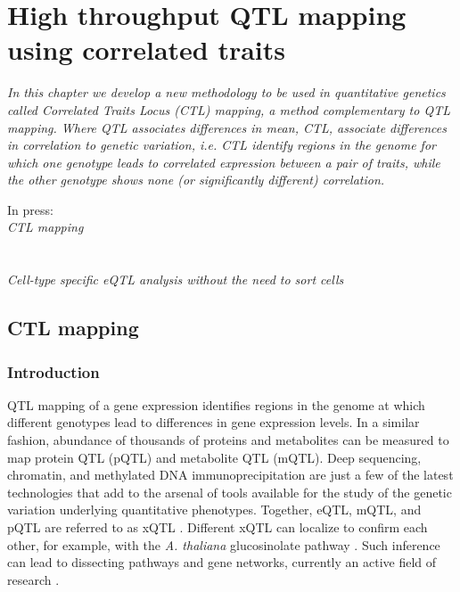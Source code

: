 \chapter{High throughput QTL mapping using correlated traits}
\thispagestyle{empty}
\label{chap:ctlmapping}

\emph{In this chapter we develop a new methodology to be used in quantitative genetics 
called Correlated Traits Locus (CTL) mapping, a method complementary to QTL mapping. 
Where QTL associates differences in mean, CTL, associate differences in correlation to 
genetic variation, i.e. CTL identify regions in the genome for which one genotype leads 
to correlated expression between a pair of traits, while the other genotype shows none 
(or significantly different) correlation.}

\null
\vfill

\begin{myexampleblock}{In press:}
  \\
  \emph{CTL mapping}\\
  \\

  \\
  \emph{Cell-type specific eQTL analysis without the need to sort cells}\\
\end{myexampleblock}

\newpage
\section{CTL mapping}
\subsection{Introduction}
  QTL mapping of a gene expression identifies regions in the genome at which different genotypes lead to differences in gene
  expression levels. In a similar fashion, abundance of thousands of proteins and metabolites can be measured to map protein 
  QTL (pQTL) and metabolite QTL (mQTL). 
  Deep sequencing, chromatin, and methylated DNA immunoprecipitation are just a few of the latest technologies that add to 
  the arsenal of tools available for the study of the genetic variation underlying quantitative phenotypes. Together, eQTL, 
  mQTL, and pQTL are referred to as xQTL \cite{Arends:2012}. Different xQTL can localize to confirm each other, for example, 
  with the \emph{A. thaliana} glucosinolate pathway \cite{Jansen:2009}. Such inference can lead to dissecting pathways and gene networks, 
  currently an active field of research \cite{Prins:2012}.

